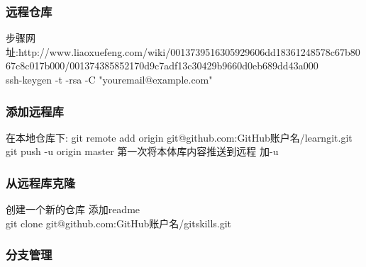 \documentclass{beamer}
\newcommand{\quotes}[1]{"#1"}
\begin{document}
\begin{CJK}{UTF8}{gkai}
  \begin{frame}\frametitle{远程仓库}
步骤网址:http://www.liaoxuefeng.com/wiki/0013739516305929606dd18361248578c67b8067c8c017b000/001374385852170d9c7adf13c30429b9660d0eb689dd43a000\\
    ssh-keygen -t -rsa -C \quotes{youremail@example.com}\\
  \end{frame}

  \begin{frame}\frametitle{添加远程库}
    在本地仓库下:
    git remote add origin git@github.com:GitHub账户名/learngit.git\\
    git push -u origin master 第一次将本体库内容推送到远程 加-u\\
  \end{frame}

  \begin{frame}\frametitle{从远程库克隆}
    创建一个新的仓库  添加readme\\
    git clone git@github.com:GitHub账户名/gitskills.git\\
  \end{frame}

  \begin{frame}\frametitle{分支管理}

  \end{frame}

\end{CJK}
\end{document}
